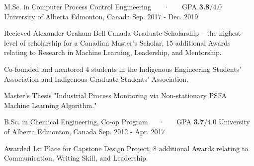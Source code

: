

\begin{cventries}

  \cventry
    {M.Sc. in Computer Process Control Engineering ~~~·~~~ GPA \textbf{3.8}/4.0} %
    {University of Alberta} %
    {Edmonton, Canada} %
    {Sep. 2017 - Dec. 2019} %
    {
      \begin{cvitems} %
        \item {Recieved Alexander Graham Bell Canada Graduate Scholarship – the highest level of scholarship for a Canadian Master's Scholar, 15 additional Awards relating to Research in Machine Learning, Leadership, and Mentorship.}
        \item{Co-founded and mentored 4 students in the Indigenous Engineering Students' Association and Indigenous Graduate Students' Association.}
         \item {Master's Thesis "Industrial Process Monitoring via Non-stationary PSFA Machine Learning Algorithm."}
      \end{cvitems}
    }

\cventry
{B.Sc. in Chemical Engineering, Co-op Program~~~·~~~ GPA \textbf{3.7}/4.0} %
{University of Alberta} %
{Edmonton, Canada} %
{Sep. 2012 - Apr. 2017} %
{
	\begin{cvitems} %
		\item {Awarded 1st Place for Capstone Design Project, 8 additional Awards relating to Communication, Writing Skill, and Leadership.}
	\end{cvitems}
}

\end{cventries}
